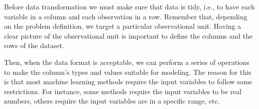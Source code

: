 Before data transformation we must make sure that data is tidy, i.e., to have
each variable in a column and each observation in a row.  Remember that, depending on the
problem definition, we target a particular observational unit.  Having a clear picture of
the observational unit is important to define the columns and the rows of the dataset.

Then, when the data format is acceptable, we can perform a series of operations to make the
column's types and values suitable for modeling.  The reason for this is that most
machine learning methods require the input variables to follow some restrictions.  For
instance, some methods require the input variables to be real numbers, others require the
input variables are in a specific range, etc.

%
%
%
%


